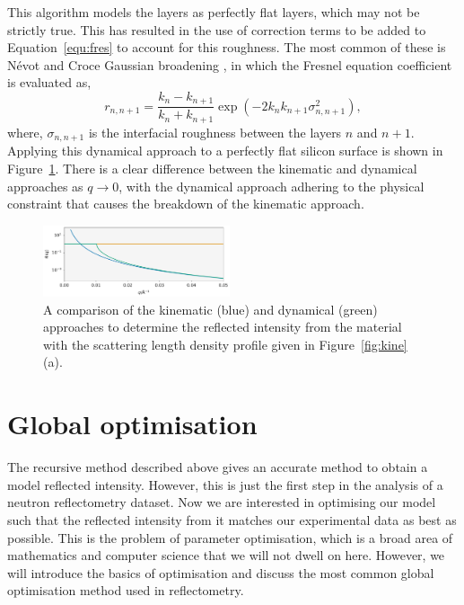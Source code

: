 \documentclass[
 reprint,
 superscriptaddress,
 amsmath,amssymb,
 aps,
]{revtex4-2}
\begin{document}
This algorithm models the layers as perfectly flat layers, which may not be strictly true. 
This has resulted in the use of correction terms to be added to Equation~\ref{equ:fres} to account for this roughness. 
The most common of these is N\'{e}vot and Croce Gaussian broadening \cite{nevot_caracterisation_1980}, in which the Fresnel equation coefficient is evaluated as, 
%
\begin{equation}
    r_{n, n+1} = \frac{k_n - k_{n+1}}{k_n + k_{n+1}} \exp{(-2k_nk_{n+1}\sigma^2_{n,n+1})},
\end{equation}
%
where, $\sigma_{n, n+1}$ is the interfacial roughness between the layers $n$ and $n+1$. 
Applying this dynamical approach to a perfectly flat silicon surface is shown in Figure~\ref{fig:dyna}.
There is a clear difference between the kinematic and dynamical approaches as $q \to 0$, with the dynamical approach adhering to the physical constraint that causes the breakdown of the kinematic approach.  
%
\begin{figure}[t]
    \includegraphics[width=0.49\textwidth]{dyna}
    \caption{A comparison of the kinematic (blue) and dynamical (green) approaches to determine the reflected intensity from the material with the scattering length density profile given in Figure~\ref{fig:kine}(a).}
    \label{fig:dyna}
\end{figure}
%

\section{Global optimisation}
The recursive method described above gives an accurate method to obtain a model reflected intensity. 
However, this is just the first step in the analysis of a neutron reflectometry dataset. 
Now we are interested in optimising our model such that the reflected intensity from it matches our experimental data as best as possible. 
This is the problem of parameter optimisation, which is a broad area of mathematics and computer science that we will not dwell on here. 
However, we will introduce the basics of optimisation and discuss the most common global optimisation method used in reflectometry. 
\end{document}
